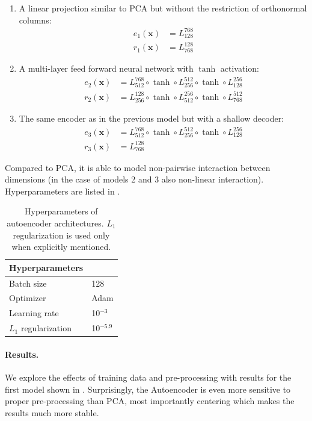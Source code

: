 \begin{enumerate}
\item A linear projection similar to PCA but without the restriction of orthonormal columns:
\begin{align*}
e_1(\bm{x}) &= L^{768}_{128} \\
r_1(\bm{x}) &= L^{128}_{768}
\end{align*}

\item A multi-layer feed forward neural network with $\tanh$ activation:
\begin{align*}
e_2(\bm{x}) &= L^{768}_{512} \circ \tanh \circ L^{512}_{256} \circ \tanh \circ L^{256}_{128} \\
r_2(\bm{x}) &= L^{128}_{256} \circ \tanh \circ L^{256}_{512} \circ \tanh \circ L^{512}_{768}
\end{align*}

\item The same encoder as in the previous model but with a shallow decoder:
\begin{align*}
e_3(\bm{x}) &= L^{768}_{512} \circ \tanh \circ L^{512}_{256} \circ \tanh \circ L^{256}_{128} \\ r_3(\bm{x}) &= L^{128}_{768}
\end{align*}
\end{enumerate}

Compared to PCA, it is able to model non-pairwise interaction between dimensions (in the case of models 2 and 3 also non-linear interaction).
Hyperparameters are listed in .

\begin{table}[ht]
\center
\begin{tabular}{ll}
\toprule
\textbf{Hyperparameters} \\ \midrule
Batch size & 128 \\
Optimizer & Adam \\
Learning rate & 10$^{-3}$ \\
$L_1$ regularization & 10$^{-5.9}$ \\
\bottomrule
\end{tabular}
\caption{Hyperparameters of autoencoder architectures.
$L_1$ regularization is used only when explicitly mentioned.}
\label{tab:auto_config}
\end{table}

\paragraph{Results.}
We explore the effects of training data and pre-processing with results for the first model shown in .
Surprisingly, the Autoencoder is even more sensitive to proper pre-processing than PCA, most importantly centering which makes the results much more stable.

